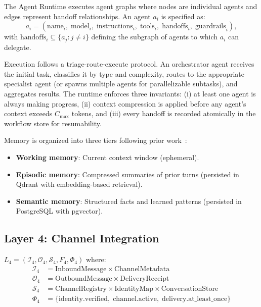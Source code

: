The Agent Runtime executes agent graphs where nodes are individual agents and
edges represent handoff relationships. An agent $a_i$ is specified as:
\begin{equation}
    a_i = \left(\text{name}_i,\; \text{model}_i,\; \text{instructions}_i,\;
                 \text{tools}_i,\; \text{handoffs}_i,\; \text{guardrails}_i\right),
\end{equation}
with $\text{handoffs}_i \subseteq \{a_j : j \neq i\}$ defining the subgraph
of agents to which $a_i$ can delegate.

Execution follows a triage-route-execute protocol. An orchestrator agent
receives the initial task, classifies it by type and complexity, routes to the
appropriate specialist agent (or spawns multiple agents for parallelizable
subtasks), and aggregates results. The runtime enforces three invariants:
(i) at least one agent is always making progress, (ii) context compression is
applied before any agent's context exceeds $C_{\max}$ tokens, and (iii) every
handoff is recorded atomically in the workflow store for resumability.

Memory is organized into three tiers following prior work~\cite{hanzo2024sdk}:
\begin{itemize}[leftmargin=1.5em]
    \item \textbf{Working memory}: Current context window (ephemeral).
    \item \textbf{Episodic memory}: Compressed summaries of prior turns
          (persisted in Qdrant with embedding-based retrieval).
    \item \textbf{Semantic memory}: Structured facts and learned patterns
          (persisted in PostgreSQL with pgvector).
\end{itemize}

\subsection{Layer 4: Channel Integration}

\begin{definition}
    $L_4 = \left(\mathcal{I}_4, \mathcal{O}_4, \mathcal{S}_4, F_4, \Phi_4\right)$ where:
    \begin{align*}
        \mathcal{I}_4 &= \text{InboundMessage} \times \text{ChannelMetadata} \\
        \mathcal{O}_4 &= \text{OutboundMessage} \times \text{DeliveryReceipt} \\
        \mathcal{S}_4 &= \text{ChannelRegistry} \times \text{IdentityMap} \times
                         \text{ConversationStore} \\
        \Phi_4 &= \{\text{identity.verified},\; \text{channel.active},\;
                    \text{delivery.at\_least\_once}\}
    \end{align*}
\end{definition}

